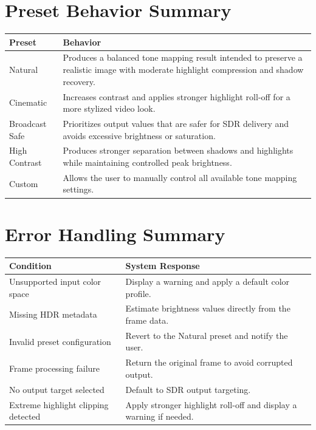 \documentclass{article}
\begin{document}
\section{Preset Behavior Summary}

\begin{longtable}{|p{1.2in}|p{4.6in}|}
\hline
\textbf{Preset} & \textbf{Behavior} \\
\hline
Natural & Produces a balanced tone mapping result intended to preserve a realistic image with moderate highlight compression and shadow recovery. \\
\hline
Cinematic & Increases contrast and applies stronger highlight roll-off for a more stylized video look. \\
\hline
Broadcast Safe & Prioritizes output values that are safer for SDR delivery and avoids excessive brightness or saturation. \\
\hline
High Contrast & Produces stronger separation between shadows and highlights while maintaining controlled peak brightness. \\
\hline
Custom & Allows the user to manually control all available tone mapping settings. \\
\hline
\end{longtable}

\section{Error Handling Summary}

\begin{longtable}{|p{2.1in}|p{3.7in}|}
\hline
\textbf{Condition} & \textbf{System Response} \\
\hline
Unsupported input color space & Display a warning and apply a default color profile. \\
\hline
Missing HDR metadata & Estimate brightness values directly from the frame data. \\
\hline
Invalid preset configuration & Revert to the Natural preset and notify the user. \\
\hline
Frame processing failure & Return the original frame to avoid corrupted output. \\
\hline
No output target selected & Default to SDR output targeting. \\
\hline
Extreme highlight clipping detected & Apply stronger highlight roll-off and display a warning if needed. \\
\hline
\end{longtable}
\end{document}
